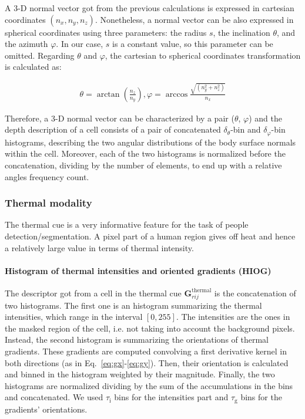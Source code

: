 \documentclass[10pt,twocolumn,letterpaper]{article}
\begin{document}
A 3-D normal vector got from the previous calculations is expressed in cartesian coordinates $(n_x, n_y, n_z)$. Nonetheless, a normal vector can be also expressed in spherical coordinates using three parameters: the radius $s$, the inclination $\theta$, and the azimuth $\varphi$. In our case, $s$ is a constant value, so this parameter can be omitted. Regarding $\theta$ and $\varphi$, the cartesian to spherical coordinates transformation is calculated as:

\begin{gather}	
	\theta  = \arctan{\left( \frac{n_z}{n_y} \right)},
	\varphi = \arccos{\frac{ \sqrt{(n_y^2 + n_z^2)} }{n_x}}
\end{gather}

Therefore, a 3-D normal vector can be characterized by a pair ($\theta$, $\varphi$) and the depth description of a cell consists of a pair of concatenated $\delta_\theta$-bin and $\delta_\varphi$-bin histograms, describing the two angular distributions of the body surface normals within the cell. Moreover, each of the two histograms is normalized before the concatenation, dividing by the number of elements, to end up with a relative angles frequency count.

\subsubsection{Thermal modality}
\label{sssec:thermal}

The thermal cue is a very informative feature for the task of people detection/segmentation. A pixel part of a human region gives off heat and hence a relatively large value in terms of thermal intensity.

\paragraph{Histogram of thermal intensities and oriented gradients (HIOG)} 
The descriptor got from a cell in the thermal cue $\mathbf{G}_{rij}^{\mathrm{thermal}}$ is the concatenation of two histograms. The first one is an histogram summarizing the thermal intensities, which range in the interval $[0, 255]$. The intensities are the ones in the masked region of the cell, i.e. not taking into account the background pixels. Instead, the second histogram is summarizing the orientations of thermal gradients. These gradients are computed convolving a first derivative kernel in both directions (as in Eq.~\ref{eq:gx}-\ref{eq:gy}). Then, their orientation is calculated and binned in the histogram weighted by their magnitude. Finally, the two histograms are normalized dividing by the sum of the accumulations in the bins and concatenated. We used $\tau_{\mathrm{i}}$ bins for the intensities part and $\tau_{\mathrm{g}}$ bins for the gradients' orientations.
\end{document}
